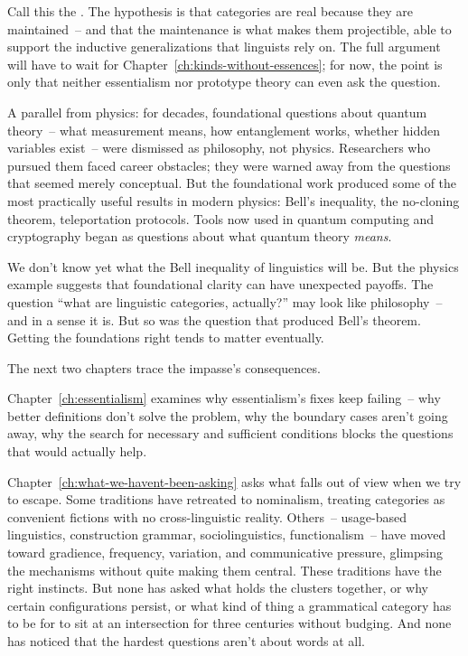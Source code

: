 Call this the . The hypothesis is that categories are real because they are maintained~-- and that the maintenance is what makes them projectible, able to support the inductive generalizations that linguists rely on. The full argument will have to wait for Chapter~\ref{ch:kinds-without-essences}; for now, the point is only that neither essentialism nor prototype theory can even ask the question.

A parallel from physics: for decades, foundational questions about quantum theory~-- what measurement means, how entanglement works, whether hidden variables exist~-- were dismissed as philosophy, not physics. Researchers who pursued them faced career obstacles; they were warned away from the questions that seemed merely conceptual. But the foundational work produced some of the most practically useful results in modern physics: Bell's inequality, the no-cloning theorem, teleportation protocols. Tools now used in quantum computing and cryptography began as questions about what quantum theory \emph{means}.

We don't know yet what the Bell inequality of linguistics will be. But the physics example suggests that foundational clarity can have unexpected payoffs. The question \enquote{what are linguistic categories, actually?} may look like philosophy~-- and in a sense it is. But so was the question that produced Bell's theorem. Getting the foundations right tends to matter eventually.

The next two chapters trace the impasse's consequences.

Chapter~\ref{ch:essentialism} examines why essentialism's fixes keep failing~-- why better definitions don't solve the problem, why the boundary cases aren't going away, why the search for necessary and sufficient conditions blocks the questions that would actually help.

Chapter~\ref{ch:what-we-havent-been-asking} asks what falls out of view when we try to escape. Some traditions have retreated to nominalism, treating categories as convenient fictions with no cross-linguistic reality. Others~-- usage-based linguistics, construction grammar, sociolinguistics, functionalism~-- have moved toward gradience, frequency, variation, and communicative pressure, glimpsing the mechanisms without quite making them central. These traditions have the right instincts. But none has asked what holds the clusters together, or why certain configurations persist, or what kind of thing a grammatical category has to be for  to sit at an intersection for three centuries without budging. And none has noticed that the hardest questions aren't about words at all.

